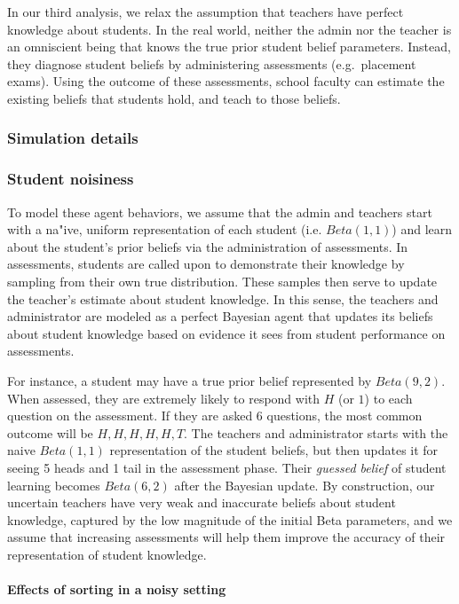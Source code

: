 \documentclass[10pt, letterpaper]{article}
\begin{document}
In our third analysis, we relax the assumption that teachers have
perfect knowledge about students. In the real world, neither the admin
nor the teacher is an omniscient being that knows the true prior student
belief parameters. Instead, they diagnose student beliefs by
administering assessments (e.g.~placement exams). Using the outcome of
these assessments, school faculty can estimate the existing beliefs that
students hold, and teach to those beliefs.

\subsubsection{Simulation details}\label{simulation-details-1}

\subsubsection{Student noisiness}\label{student-noisiness}

To model these agent behaviors, we assume that the admin and teachers
start with a na"ive, uniform representation of each student (i.e.
\(Beta(1,1)\)) and learn about the student's prior beliefs via the
administration of assessments. In assessments, students are called upon
to demonstrate their knowledge by sampling from their own true
distribution. These samples then serve to update the teacher's estimate
about student knowledge. In this sense, the teachers and administrator
are modeled as a perfect Bayesian agent that updates its beliefs about
student knowledge based on evidence it sees from student performance on
assessments.

For instance, a student may have a true prior belief represented by
\(Beta(9,2)\). When assessed, they are extremely likely to respond with
\(H\) (or \(1\)) to each question on the assessment. If they are asked 6
questions, the most common outcome will be \({H, H, H, H, H, T}\). The
teachers and administrator starts with the naive \(Beta(1,1)\)
representation of the student beliefs, but then updates it for seeing 5
heads and 1 tail in the assessment phase. Their \emph{guessed belief} of
student learning becomes \(Beta(6,2)\) after the Bayesian update. By
construction, our uncertain teachers have very weak and inaccurate
beliefs about student knowledge, captured by the low magnitude of the
initial Beta parameters, and we assume that increasing assessments will
help them improve the accuracy of their representation of student
knowledge.

\paragraph{Effects of sorting in a noisy
setting}\label{effects-of-sorting-in-a-noisy-setting}
\end{document}
